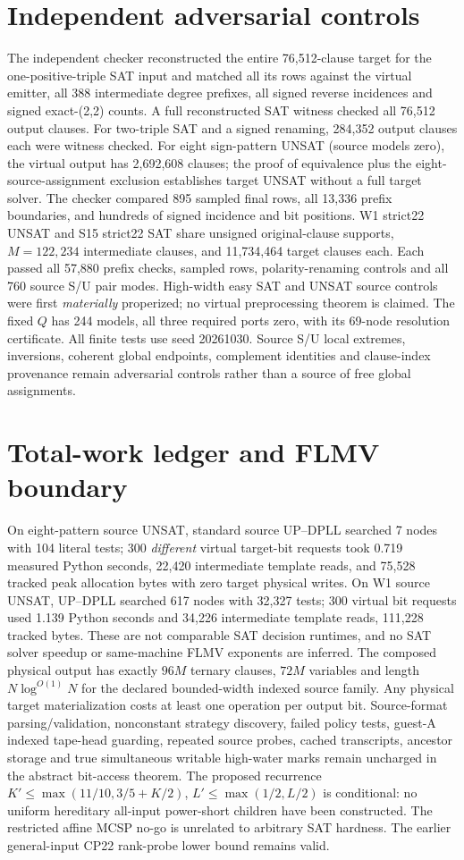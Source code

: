 \documentclass[11pt]{article}
\begin{document}
\section{Independent adversarial controls}
The independent checker reconstructed the entire 76,512-clause target for the one-positive-triple SAT input and matched all its rows against the virtual emitter, all 388 intermediate degree prefixes, all signed reverse incidences and signed exact-(2,2) counts. A full reconstructed SAT witness checked all 76,512 output clauses. For two-triple SAT and a signed renaming, 284,352 output clauses each were witness checked. For eight sign-pattern UNSAT (source models zero), the virtual output has 2,692,608 clauses; the proof of equivalence plus the eight-source-assignment exclusion establishes target UNSAT without a full target solver. The checker compared 895 sampled final rows, all 13,336 prefix boundaries, and hundreds of signed incidence and bit positions. W1 strict22 UNSAT and S15 strict22 SAT share unsigned original-clause supports, $M=122,234$ intermediate clauses, and 11,734,464 target clauses each. Each passed all 57,880 prefix checks, sampled rows, polarity-renaming controls and all 760 source S/U pair modes. High-width easy SAT and UNSAT source controls were first \emph{materially} properized; no virtual preprocessing theorem is claimed. The fixed $Q$ has 244 models, all three required ports zero, with its 69-node resolution certificate. All finite tests use seed 20261030. Source S/U local extremes, inversions, coherent global endpoints, complement identities and clause-index provenance remain adversarial controls rather than a source of free global assignments.
\section{Total-work ledger and FLMV boundary}
On eight-pattern source UNSAT, standard source UP--DPLL searched 7 nodes with 104 literal tests; 300 \emph{different} virtual target-bit requests took 0.719 measured Python seconds, 22,420 intermediate template reads, and 75,528 tracked peak allocation bytes with zero target physical writes. On W1 source UNSAT, UP--DPLL searched 617 nodes with 32,327 tests; 300 virtual bit requests used 1.139 Python seconds and 34,226 intermediate template reads, 111,228 tracked bytes. These are not comparable SAT decision runtimes, and no SAT solver speedup or same-machine FLMV exponents are inferred.
The composed physical output has exactly $96M$ ternary clauses, $72M$ variables and length $N\log^{O(1)}N$ for the declared bounded-width indexed source family. Any physical target materialization costs at least one operation per output bit. Source-format parsing/validation, nonconstant strategy discovery, failed policy tests, guest-A indexed tape-head guarding, repeated source probes, cached transcripts, ancestor storage and true simultaneous writable high-water marks remain uncharged in the abstract bit-access theorem. The proposed recurrence $K'\le\max(11/10,3/5+K/2)$, $L'\le\max(1/2,L/2)$ is conditional: no uniform hereditary all-input power-short children have been constructed. The restricted affine MCSP no-go is unrelated to arbitrary SAT hardness. The earlier general-input CP22 rank-probe lower bound remains valid.
\end{document}
